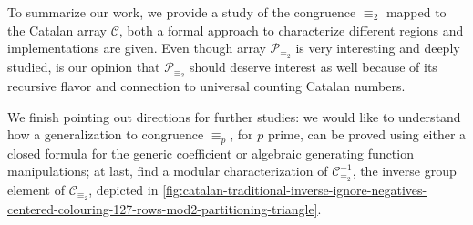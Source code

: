 To summarize our work, we provide a study of the congruence
$\equiv_{2}$ mapped to the Catalan array $\mathcal{C}$, both a formal
approach to characterize different regions and implementations are
given. Even though array $\mathcal{P}_{\equiv_{2}}$ is very
interesting and deeply studied, is our opinion that
$\mathcal{P}_{\equiv_{2}}$ should deserve interest as well because of
its recursive flavor and connection to universal counting Catalan
numbers.

We finish pointing out directions for further studies: we would like
to understand how a generalization to congruence $\equiv_{p}$, for $p$
prime, can be proved using either a closed formula for the generic
coefficient or algebraic generating function manipulations; at last,
find a modular characterization of $\mathcal{C}_{\equiv_{2}}^{-1}$,
the inverse group element of $\mathcal{C}_{\equiv_{2}}$, depicted in
\autoref{fig:catalan-traditional-inverse-ignore-negatives-centered-colouring-127-rows-mod2-partitioning-triangle}.


